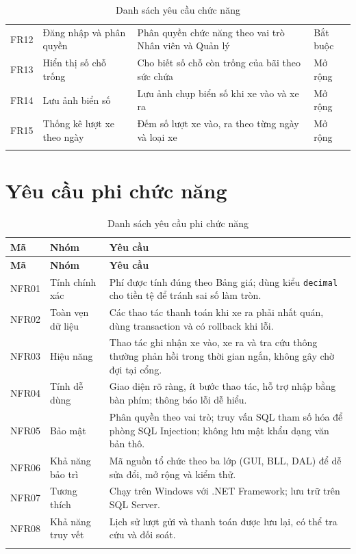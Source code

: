 \begin{longtable}{@{}l p{3.6cm} p{7.2cm} l@{}}
  FR12 & Đăng nhập và phân quyền & Phân quyền chức năng theo vai trò Nhân viên và Quản lý & Bắt buộc \\
  FR13 & Hiển thị số chỗ trống & Cho biết số chỗ còn trống của bãi theo sức chứa & Mở rộng \\
  FR14 & Lưu ảnh biển số & Lưu ảnh chụp biển số khi xe vào và xe ra & Mở rộng \\
  FR15 & Thống kê lượt xe theo ngày & Đếm số lượt xe vào, ra theo từng ngày và loại xe & Mở rộng \\
  \bottomrule
  \caption{Danh sách yêu cầu chức năng}\label{tab:fr}\\
\end{longtable}

\section{Yêu cầu phi chức năng}

\begin{longtable}{@{}l p{3.4cm} p{9.2cm}@{}}
  \toprule
  \textbf{Mã} & \textbf{Nhóm} & \textbf{Yêu cầu} \\
  \midrule
  \endfirsthead
  \toprule
  \textbf{Mã} & \textbf{Nhóm} & \textbf{Yêu cầu} \\
  \midrule
  \endhead
  NFR01 & Tính chính xác & Phí được tính đúng theo Bảng giá; dùng kiểu \texttt{decimal} cho tiền tệ để tránh sai số làm tròn. \\
  NFR02 & Toàn vẹn dữ liệu & Các thao tác thanh toán khi xe ra phải nhất quán, dùng transaction và có rollback khi lỗi. \\
  NFR03 & Hiệu năng & Thao tác ghi nhận xe vào, xe ra và tra cứu thông thường phản hồi trong thời gian ngắn, không gây chờ đợi tại cổng. \\
  NFR04 & Tính dễ dùng & Giao diện rõ ràng, ít bước thao tác, hỗ trợ nhập bằng bàn phím; thông báo lỗi dễ hiểu. \\
  NFR05 & Bảo mật & Phân quyền theo vai trò; truy vấn SQL tham số hóa để phòng SQL Injection; không lưu mật khẩu dạng văn bản thô. \\
  NFR06 & Khả năng bảo trì & Mã nguồn tổ chức theo ba lớp (GUI, BLL, DAL) để dễ sửa đổi, mở rộng và kiểm thử. \\
  NFR07 & Tương thích & Chạy trên Windows với .NET Framework; lưu trữ trên SQL Server. \\
  NFR08 & Khả năng truy vết & Lịch sử lượt gửi và thanh toán được lưu lại, có thể tra cứu và đối soát. \\
  \bottomrule
  \caption{Danh sách yêu cầu phi chức năng}\label{tab:nfr}\\
\end{longtable}

